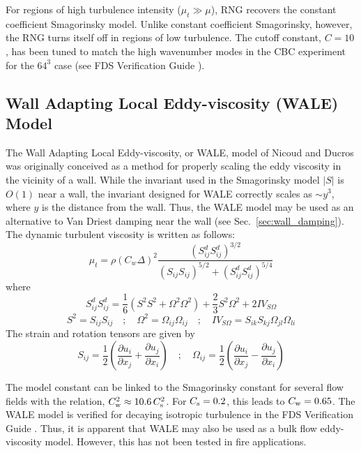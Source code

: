 For regions of high turbulence intensity ($\mu_t \gg \mu$), RNG recovers the constant coefficient Smagorinsky model.  Unlike constant coefficient Smagorinsky, however, the RNG turns itself off in regions of low turbulence.  The cutoff constant, $C=10$, has been tuned to match the high wavenumber modes in the CBC experiment for the $64^3$ case (see FDS Verification Guide \cite{FDS_Verification_Guide}).

\subsection{Wall Adapting Local Eddy-viscosity (WALE) Model}
\label{sec:wale}

The Wall Adapting Local Eddy-viscosity, or WALE, model of Nicoud and Ducros \cite{Nicoud:1999} was originally conceived as a method for properly scaling the eddy viscosity in the vicinity of a wall.  While the invariant used in the Smagorinsky model $|S|$ is $O(1)$ near a wall, the invariant designed for WALE correctly scales as $\sim y^3$, where $y$ is the distance from the wall.  Thus, the WALE model may be used as an alternative to Van Driest damping near the wall (see Sec.~\ref{sec:wall_damping}).  The dynamic turbulent viscosity is written as follows:
\begin{equation}
\label{eq:wale}
\mu_{\si{t}} = \rho (C_{\si{w}} \Delta)^2 \frac{(S^d_{ij} S^d_{ij})^{3/2}}{(S_{ij} S_{ij})^{5/2} + (S^d_{ij} S^d_{ij})^{5/4}}
\end{equation}
where
\begin{equation}
S^d_{ij} S^d_{ij} = \frac{1}{6} \left(S^2 S^2 + \Omega^2 \Omega^2\right) + \frac{2}{3} S^2 \Omega^2 + 2 {IV}_{S\Omega}
\end{equation}
\begin{equation*}
S^2 = S_{ij} S_{ij} \quad ; \quad \Omega^2 = \Omega_{ij} \Omega_{ij} \quad ; \quad {IV}_{S\Omega} = S_{ik}S_{kj}\Omega_{jl}\Omega_{li}
\end{equation*}
The strain and rotation tensors are given by
\begin{equation}
S_{ij} = \frac{1}{2} \left( \frac{\partial u_i}{\partial x_j} + \frac{\partial u_j}{\partial x_i} \right) \quad ; \quad \Omega_{ij} = \frac{1}{2} \left( \frac{\partial u_i}{\partial x_j} - \frac{\partial u_j}{\partial x_i} \right)
\end{equation}

The model constant can be linked to the Smagorinsky constant for several flow fields with the relation, $C_{\rm w}^2 \approx 10.6 \, C_{\rm s}^2$.  For $C_{\rm s}=0.2$, this leads to $C_{\rm w} = 0.65$.  The WALE model is verified for decaying isotropic turbulence in the FDS Verification Guide \cite{FDS_Verification_Guide}.  Thus, it is apparent that WALE may also be used as a bulk flow eddy-viscosity model.  However, this has not been tested in fire applications.

